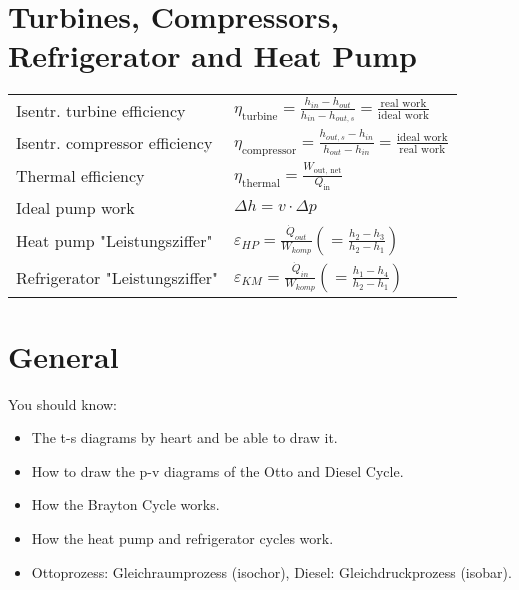 \section*{Turbines, Compressors, Refrigerator and Heat Pump}
    \begin{tabular}{ m{5cm} l}
    Isentr. turbine efficiency & $\eta_{\text{turbine}} = \frac{h_{in} - h_{out}}{h_{in} - h_{out,s}} = \frac{\text{real work}}{\text{ideal work}} $ \\
    Isentr. compressor efficiency & $\eta_{\text{compressor}} = \frac{h_{out,s} - h_{in}}{h_{out} - h_{in}} = \frac{\text{ideal work}}{\text{real work}} $  \\
    Thermal efficiency & $\eta_{\text{thermal}} = \frac{W_{\text{out, net}}}{Q_{\text{in}}} $ \\
    Ideal pump work & $\Delta h = v \cdot \Delta p$ \\
    Heat pump "Leistungsziffer" & $\varepsilon_{HP} = \frac{\Dot{Q}_{out}}{W_{komp}} \left( = \frac{h_2 - h_3}{h_2 - h_1} \right) $ \\
    Refrigerator "Leistungsziffer" & $\varepsilon_{KM} = \frac{\Dot{Q}_{in}}{W_{komp}} \left( = \frac{h_1 - h_4}{h_2 - h_1} \right)$ \\
    \end{tabular}
    
\section*{General}
You should know:
\begin{itemize}
    \item The t-s diagrams by heart and be able to draw it.
    \item How to draw the p-v diagrams of the Otto and Diesel Cycle.
    \item How the Brayton Cycle works. 
    \item How the heat pump and refrigerator cycles work.
    \item Ottoprozess: Gleichraumprozess (isochor), Diesel: Gleichdruckprozess (isobar).
    
    
\end{itemize}


